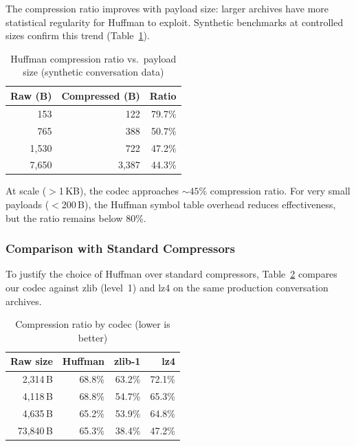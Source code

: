 \documentclass[conference]{IEEEtran}
\begin{document}
The compression ratio improves with payload size: larger archives have more statistical regularity for Huffman to exploit. Synthetic benchmarks at controlled sizes confirm this trend (Table~\ref{tab:compression_scaling}).

\begin{table}[h]
\centering
\caption{Huffman compression ratio vs.\ payload size (synthetic conversation data)}
\label{tab:compression_scaling}
\begin{tabular}{rrr}
\toprule
\textbf{Raw (B)} & \textbf{Compressed (B)} & \textbf{Ratio} \\
\midrule
153 & 122 & 79.7\% \\
765 & 388 & 50.7\% \\
1{,}530 & 722 & 47.2\% \\
7{,}650 & 3{,}387 & 44.3\% \\
\bottomrule
\end{tabular}
\end{table}

At scale ($>$1\,KB), the codec approaches ${\sim}45\%$ compression ratio. For very small payloads ($<$200\,B), the Huffman symbol table overhead reduces effectiveness, but the ratio remains below 80\%.

\subsubsection{Comparison with Standard Compressors}

To justify the choice of Huffman over standard compressors, Table~\ref{tab:compression_comparison} compares our codec against zlib (level~1) and lz4 on the same production conversation archives.

\begin{table}[h]
\centering
\caption{Compression ratio by codec (lower is better)}
\label{tab:compression_comparison}
{\scriptsize
\begin{tabular}{@{}rrrr@{}}
\toprule
\textbf{Raw size} & \textbf{Huffman} & \textbf{zlib-1} & \textbf{lz4} \\
\midrule
2{,}314\,B & 68.8\% & 63.2\% & 72.1\% \\
4{,}118\,B & 68.8\% & 54.7\% & 65.3\% \\
4{,}635\,B & 65.2\% & 53.9\% & 64.8\% \\
73{,}840\,B & 65.3\% & 38.4\% & 47.2\% \\
\bottomrule
\end{tabular}}
\end{table}
\end{document}
